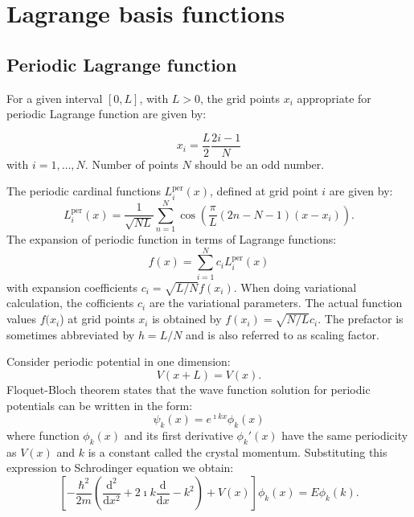 \chapter{Lagrange basis functions}

\section{Periodic Lagrange function}

For a given interval $[0,L]$, with $L>0$, the grid points $x_{i}$
appropriate for periodic Lagrange function are given by:

\begin{equation}
x_{i}=\frac{L}{2}\frac{2i-1}{N}
\end{equation}
with $i=1,\ldots,N$. Number of points $N$ should be an odd number.

The periodic cardinal functions $L_{i}^{\mathrm{per}}(x)$, defined
at grid point $i$ are given by:
\begin{equation}
L_{i}^{\mathrm{per}}(x)=\frac{1}{\sqrt{NL}}\sum_{n=1}^{N}\cos\left(\frac{\pi}{L}(2n-N-1)(x-x_{i})\right).
\end{equation}
The expansion of periodic function in terms of Lagrange functions:
\begin{equation}
f(x)=\sum_{i=1}^{N}c_{i}L_{i}^{\mathrm{per}}(x)
\end{equation}
with expansion coefficients $c_{i}=\sqrt{L/N}f(x_{i})$. When doing
variational calculation, the cofficients $c_{i}$ are the variational
parameters. The actual function values $f(x_{i}$) at grid points
$x_{i}$ is obtained by $f(x_{i})=\sqrt{N/L}c_{i}$. The prefactor
is sometimes abbreviated by $h=L/N$ and is also referred to as scaling
factor.

Consider periodic potential in one dimension:
\begin{equation}
V(x+L)=V(x).
\end{equation}
Floquet-Bloch theorem states that the wave function solution for periodic
potentials can be written in the form:
\begin{equation}
\psi_{k}(x)=e^{\imath kx}\phi_{k}(x)
\end{equation}
where function $\phi_{k}(x)$ and its first derivative $\phi_{k}'(x)$
have the same periodicity as $V(x)$ and $k$ is a constant called
the crystal momentum. Substituting this expression to Schrodinger
equation we obtain:
\begin{equation}
\left[-\frac{\hbar^{2}}{2m}\left(\frac{\mathrm{d}^{2}}{\mathrm{d}x^{2}}+2\imath k\frac{\mathrm{d}}{\mathrm{d}x}-k^{2}\right)+V(x)\right]\phi_{k}(x)=E\phi_{k}(k).
\end{equation}


